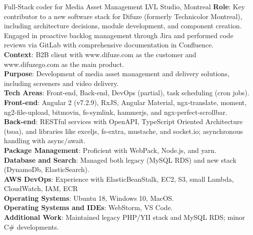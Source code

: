 \documentclass[
  a4paper,
   maincolor=cvblue,
   sectioncolor=cvblue,
]{fortysecondscv}
\begin{document}
\begin{cvtable}
    {Full-Stack coder for Media Asset Management}
    {LVL Studio, Montreal}
    {
      \textbf{Role}: Key contributor to a new software stack for Difuze (formerly Technicolor Montreal),
      including architecture decisions, module development, and component creation.
      Engaged in proactive backlog management through Jira and performed code reviews
      via GitLab with comprehensive documentation in Confluence.\\
      \textbf{Context}: B2B client with www.difuze.com as the customer and www.difuzego.com as the main product.\\
      \textbf{Purpose}: Development of media asset management and delivery solutions, including screeners and video delivery.\\
      \textbf{Tech Areas}: Front-end, Back-end, DevOps (partial), task scheduling (cron jobs).\\
      \textbf{Front-end}: Angular 2 (v7.2.9), RxJS, Angular Material, ngx-translate, moment, ng2-file-upload, bitmovin, fs-symlink, hammerjs, and ngx-perfect-scrollbar.\\
      \textbf{Back-end}: RESTful services with OpenAPI, TypeScript Oriented Architecture (tsoa), and libraries like exceljs, fs-extra, mustache, and socket.io; asynchronous handling with async/await.\\
      \textbf{Package Management}: Proficient with WebPack, Node.js, and yarn.\\
      \textbf{Database and Search}: Managed both legacy (MySQL RDS) and new stack (DynamoDb, ElasticSearch).\\
      \textbf{AWS DevOps}: Experience with ElasticBeanStalk, EC2, S3, small Lambda, CloudWatch, IAM, ECR\\
      \textbf{Operating Systems}: Ubuntu 18, Windows 10, MacOS.\\
      \textbf{Operating Systems and IDEs}: WebStorm, VS Code.\\
      \textbf{Additional Work}: Maintained legacy PHP/YII stack and MySQL RDS; minor C\# developments.
    }
\end{cvtable}
\end{document}
